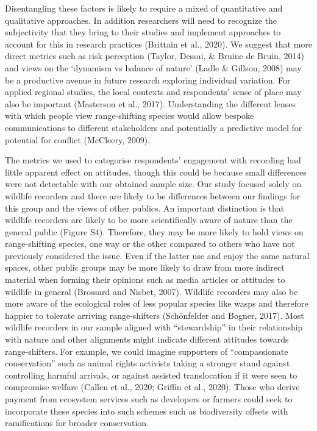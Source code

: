 \documentclass[
]{article}
\begin{document}
Disentangling these factors is likely to require a mixed of quantitative
and qualitative approaches. In addition researchers will need to
recognize the subjectivity that they bring to their studies and
implement approaches to account for this in research practices (Brittain
et al., 2020). We suggest that more direct metrics such as risk
perception (Taylor, Dessai, \& Bruine de Bruin, 2014) and views on the
`dynamism vs balance of nature' (Ladle \& Gillson, 2008) may be a
productive avenue in future research exploring individual variation. For
applied regional studies, the local contexts and respondents' sense of
place may also be important (Masterson et al., 2017). Understanding the
different lenses with which people view range-shifting species would
allow bespoke communications to different stakeholders and potentially a
predictive model for potential for conflict (McCleery, 2009).

The metrics we used to categorise respondents' engagement with recording
had little apparent effect on attitudes, though this could be because
small differences were not detectable with our obtained sample size. Our
study focused solely on wildlife recorders and there are likely to be
differences between our findings for this group and the views of other
publics. An important distinction is that wildlife recorders are likely
to be more scientifically aware of nature than the general public
(Figure S4). Therefore, they may be more likely to hold views on
range-shifting species, one way or the other compared to others who have
not previously considered the issue. Even if the latter use and enjoy
the same natural spaces, other public groups may be more likely to draw
from more indirect material when forming their opinions such as media
articles or attitudes to wildlife in general (Brossard and Nisbet,
2007). Wildlife recorders may also be more aware of the ecological roles
of less popular species like wasps and therefore happier to tolerate
arriving range-shifters (Schönfelder and Bogner, 2017). Most wildlife
recorders in our sample aligned with ``stewardship'' in their
relationship with nature and other alignments might indicate different
attitudes towards range-shifters. For example, we could imagine
supporters of ``compassionate conservation'' such as animal rights
activists taking a stronger stand against controlling harmful arrivals,
or against assisted translocation if it were seen to compromise welfare
(Callen et al., 2020; Griffin et al., 2020). Those who derive payment
from ecosystem services such as developers or farmers could seek to
incorporate these species into such schemes such as biodiversity offsets
with ramifications for broader conservation.
\end{document}
